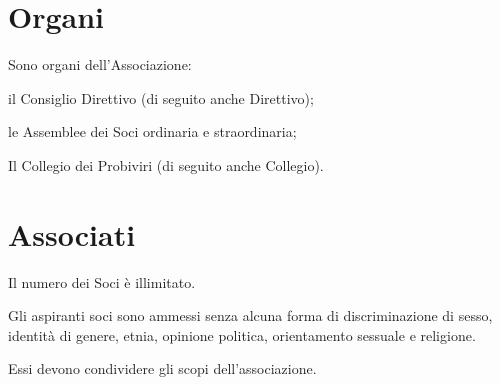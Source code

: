 \documentclass[legalpaper, 11pt]{exam}
\let\tempone\enumerate
\let\temptwo\endenumerate
\renewenvironment{enumerate}{\tempone\addtolength{\itemsep}{-0.45\baselineskip}}{\temptwo}
\begin{document}
{\section{Organi}
Sono organi dell’Associazione: 
\vspace{-5pt}
\begin{enumerate}
 \item il Consiglio Direttivo (di seguito anche Direttivo);
 \item le Assemblee dei Soci ordinaria e straordinaria;
 \item Il Collegio dei Probiviri (di seguito anche Collegio).
\end{enumerate}

\section{Associati}
\begin{enumerate}
 \item Il numero dei Soci è illimitato. 
 \item Gli aspiranti soci sono ammessi senza alcuna forma di discriminazione di sesso, identità di genere, etnia, opinione politica, orientamento sessuale e religione.
 \item Essi devono condividere gli scopi dell’associazione.
\end{enumerate}

}
\end{document}
